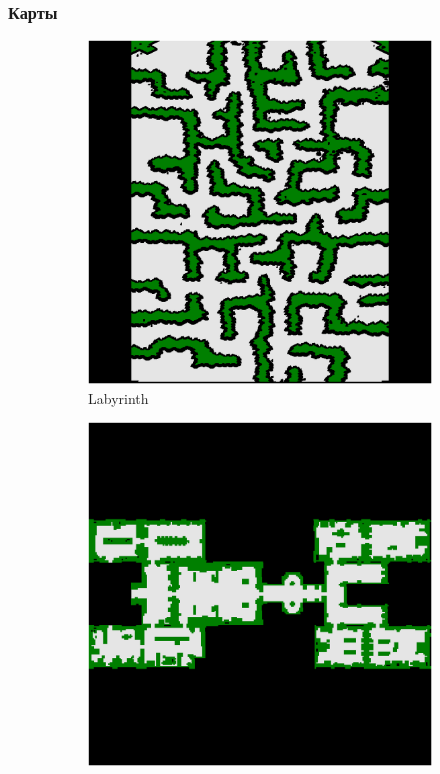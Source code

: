 \documentclass{beamer}
\begin{document}
    \begin{frame}
        \frametitle{Карты}
        \begin{figure}
            \centering
            \begin{subfigure}[b]{0.24\textwidth}
                \centering
                \includegraphics[width=\textwidth]{../maps/Labyrinth}
                \caption{Labyrinth}
                \label{fig:y equals x}
            \end{subfigure}
            \hfill
            \begin{subfigure}[b]{0.24\textwidth}
                \centering
                \includegraphics[width=\textwidth]{../maps/den401d}

\end{subfigure}
\end{figure}
\end{frame}
\end{document}
